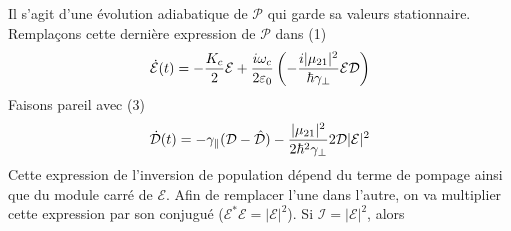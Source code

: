 Il s'agit d'une évolution adiabatique de $\mathcal{P}$ qui garde sa valeurs stationnaire. Remplaçons 
cette dernière expression de $\mathcal{P}$ dans (1)
\begin{equation}
\dot {\cal E}(t) =  - \frac{{{K_c}}}{2}{\cal E} + \frac{{i{\omega _c}}}{{2{\varepsilon _0}}}\left( { - \frac{{i|{\mu _{21}}{|^2}}}{{\hbar {\gamma _ \bot }}}{\cal E}{\cal D}} \right)
\end{equation}
Faisons pareil avec (3)
\begin{equation}
\dot {\cal D}(t) =  - {\gamma _\parallel }({{\cal D}} - {\hat {\cal D}}) - \frac{{|{\mu _{21}}{|^2}}}{{2{\hbar ^2}{\gamma _ \bot }}}2{\cal D}|{\cal E}{|^2}
\end{equation}
Cette expression de l'inversion de population dépend du terme de pompage ainsi que du module carré 
de $\mathcal{E}$. Afin de remplacer l'une dans l'autre, on va multiplier cette expression par son 
conjugué ($\mathcal{E}^*\mathcal{E}=|\mathcal{E}|^2$). Si $\mathcal{I}=|\mathcal{E}|^2$, alors\\



